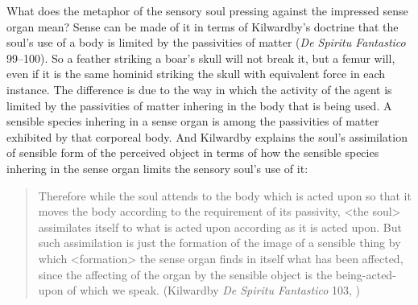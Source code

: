 What does the metaphor of the sensory soul pressing against the impressed sense organ mean? Sense can be made of it in terms of Kilwardby's doctrine that the soul's use of a body is limited by the passivities of matter (\emph{De Spiritu Fantastico} 99--100). So a feather striking a boar's skull will not break it, but a femur will, even if it is the same hominid striking the skull with equivalent force in each instance. The difference is due to the way in which the activity of the agent is limited by the passivities of matter inhering in the body that is being used. A sensible species inhering in a sense organ is among the passivities of matter exhibited by that corporeal body. And Kilwardby explains the soul's assimilation of sensible form of the perceived object in terms of how the sensible species inhering in the sense organ limits the sensory soul's use of it:
\begin{quote}
	Therefore while the soul attends to the body which is acted upon so that it moves the body according to the requirement of its passivity, <the soul> assimilates itself to what is acted upon according as it is acted upon. But such assimilation is just the formation of the image of a sensible thing by which <formation> the sense organ finds in itself what has been affected, since the affecting of the organ by the sensible object is the being-acted-upon of which we speak. (Kilwardby \emph{De Spiritu Fantastico} 103, \citealt[94]{Broadie:1993dz})
\end{quote}


